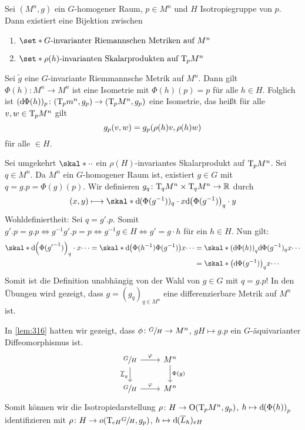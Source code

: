 \begin{lemma}
	Sei $(M^n,g)$ ein $G$-homogener Raum, $p \in M^n$ und $H$ Isotropiegruppe von $p$.
	Dann existiert eine Bijektion zwischen
	\begin{enumerate}[1)]
		\item $\set*{\text{$G$-invarianter Riemannschen Metriken auf $M^n$}}$
		\item $\set*{\text{$\rho(h)$-invarianten Skalarprodukten auf $\Tmap_p M^n$} }$
	\end{enumerate}
\end{lemma}
\begin{beweis}
	Sei $\tilde{g}$ eine $G$-invariante Riemmannsche Metrik auf $M^n$.
	Dann gilt $\Phi(h) \colon M^n \to M^n$ ist eine Isometrie mit $\Phi(h)(p)=p$ für alle $h \in H$.
	Folglich ist $(\mathd \Phi(h))_p \colon \enbrace*{\Tmap_p m^n, g_p} \to \enbrace*{\Tmap_p M^n, g_p}$ eine Isometrie, das heißt für alle $v,w \in \mathrm{T}\mkern-0.85mu_p M^n$ gilt
	\[
		g_p(v,w) = g_p \enbrace*{\rho(h)v, \rho(h)w}
	\]
	für alle $ \in H$.
	
	Sei umgekehrt $\skal*{\cdot}{\cdot}$ ein $\rho(H)$-invariantes Skalarprodukt auf $\mathrm{T}\mkern-0.85mu_p M^n$.
	Sei $q \in M^n$.
	Da $M^n$ ein $G$-homogener Raum ist, existiert $g \in G$ mit $q = g.p = \Phi(g)(p)$.
	Wir definieren $g_q \colon \mathrm{T}\mkern-0.85mu_q M^n \times \mathrm{T}\mkern-0.85mu_q M^n \to \mathbb{R}$ durch
	\[
		(x,y) \longmapsto \skal*{\mathd(\Phi(g^{-1}))_q \cdot x}{\mathd \enbrace*{\Phi(g^{-1})}_q \cdot y}
	\]
	Wohldefiniertheit: Sei $q = g' .p$.
	Somit $g'.p = g.p \iff g^{-1} g' .p =p \iff g^{-1} g \in H \iff g' = g \cdot h$ für ein $h \in H$. 
	Nun gilt:
	\begin{align}
		\skal*{\mathd \enbrace*{\Phi({g'}^{-1})}_q \cdot x}{\cdots} = \skal*{\mathd \enbrace*{\Phi(h^{-1}) \Phi(g^{-1})}x }{ \cdots} &= \skal*{ \enbrace*{\mathd \Phi(h)}_q \mathd \Phi(g^{-1})_q x}{ \cdots} \\
		&= \skal*{\enbrace*{\mathd \Phi (g^{-1})}_q x}{ \cdots}
	\end{align}
	Somit ist die Definition unabhängig von der Wahl von $g \in G$ mit $q=g.p$!
	In den Übungen wird gezeigt, dass $g=(g_q)_{q \in M^n}$ eine differenzierbare Metrik auf $M^n$ ist.
\end{beweis}

In \autoref{lem:316} hatten wir gezeigt, dass $\phi \colon \sfrac{G}{H} \to M^n$, $g H \mapsto g .p$ ein $G$-äquivarianter Diffeomorphismus ist.
\[
	\begin{tikzcd}
		\sfrac{G}{H} \dar["\overline{L}_g"'] \rar["\varphi"] & M^n \dar["\Phi(g)"] \\
		\sfrac{G}{H} \rar["\varphi"] & M^n
	\end{tikzcd}
\]
Somit können wir die Isotropiedarstellung $\rho \colon H \to \On \enbrace*{\Tmap_p M^n, g_p}$, $h \mapsto \mathd \enbrace*{\Phi(h)}_p$ identifizieren mit $\rho \colon H \to o \enbrace*{\Tmap_{eH} \sfrac{G}{H},g_p}$, $h \mapsto \mathrm{d}\mkern-1.0mu (\overline{L}_h)_{eH}$

